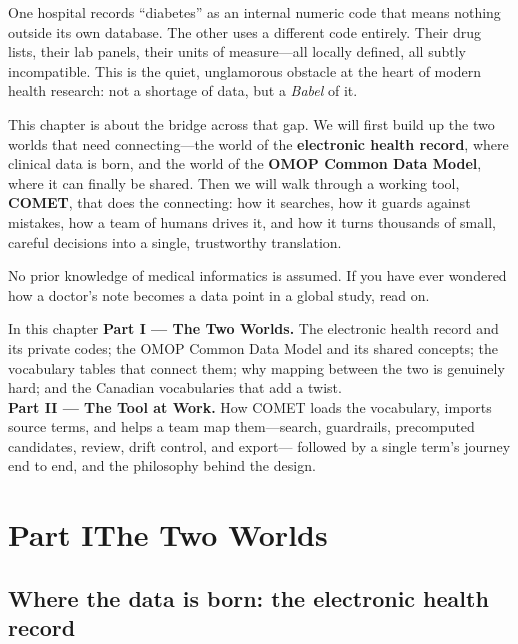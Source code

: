 \documentclass[12pt,openany]{book}
\begin{document}
One hospital records ``diabetes'' as an internal numeric code that means nothing outside its own
database. The other uses a different code entirely. Their drug lists, their lab panels, their units of
measure---all locally defined, all subtly incompatible. This is the quiet, unglamorous obstacle at the
heart of modern health research: not a shortage of data, but a \emph{Babel} of it.

This chapter is about the bridge across that gap. We will first build up the two worlds that need
connecting---the world of the \textbf{electronic health record}, where clinical data is born, and the
world of the \textbf{OMOP Common Data Model}, where it can finally be shared. Then we will walk
through a working tool, \textbf{COMET}, that does the connecting: how it searches, how it guards
against mistakes, how a team of humans drives it, and how it turns thousands of small, careful
decisions into a single, trustworthy translation.

No prior knowledge of medical informatics is assumed. If you have ever wondered how a doctor's note
becomes a data point in a global study, read on.

\begin{practice}{In this chapter}
\textbf{Part I --- The Two Worlds.} The electronic health record and its private codes; the OMOP
Common Data Model and its shared concepts; the vocabulary tables that connect them; why mapping between
the two is genuinely hard; and the Canadian vocabularies that add a twist.\\[4pt]
\textbf{Part II --- The Tool at Work.} How COMET loads the vocabulary, imports source terms, and helps
a team map them---search, guardrails, precomputed candidates, review, drift control, and export---
followed by a single term's journey end to end, and the philosophy behind the design.
\end{practice}

\clearpage
\section{Part I\quad The Two Worlds}

\subsection{Where the data is born: the electronic health record}
\end{document}
